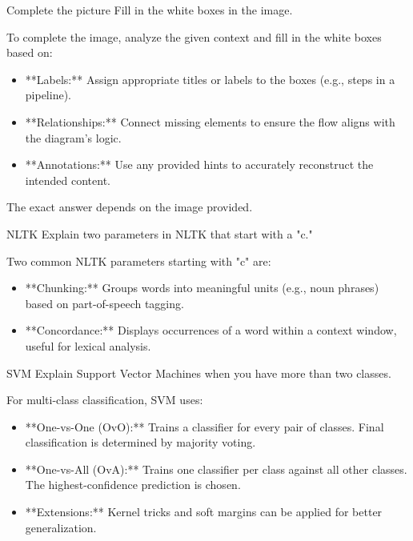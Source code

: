 \documentclass{article}
\begin{document}
\begin{exercise}{Complete the picture}
  Fill in the white boxes in the image.

  \begin{solution}
    To complete the image, analyze the given context and fill in the white boxes based on:
    \begin{itemize}
        \item **Labels:** Assign appropriate titles or labels to the boxes (e.g., steps in a pipeline).
        \item **Relationships:** Connect missing elements to ensure the flow aligns with the diagram's logic.
        \item **Annotations:** Use any provided hints to accurately reconstruct the intended content.
    \end{itemize}
    The exact answer depends on the image provided.
  \end{solution}
\end{exercise}

\begin{exercise}{NLTK}
  Explain two parameters in NLTK that start with a "c."

  \begin{solution}
    Two common NLTK parameters starting with "c" are:
    \begin{itemize}
        \item **Chunking:** Groups words into meaningful units (e.g., noun phrases) based on part-of-speech tagging.
        \item **Concordance:** Displays occurrences of a word within a context window, useful for lexical analysis.
    \end{itemize}
  \end{solution}
\end{exercise}

\begin{exercise}{SVM}
  Explain Support Vector Machines when you have more than two classes.

  \begin{solution}
    For multi-class classification, SVM uses:
    \begin{itemize}
        \item **One-vs-One (OvO):** Trains a classifier for every pair of classes. Final classification is determined by majority voting.
        \item **One-vs-All (OvA):** Trains one classifier per class against all other classes. The highest-confidence prediction is chosen.
        \item **Extensions:** Kernel tricks and soft margins can be applied for better generalization.
    \end{itemize}
  \end{solution}
\end{exercise}
\end{document}
